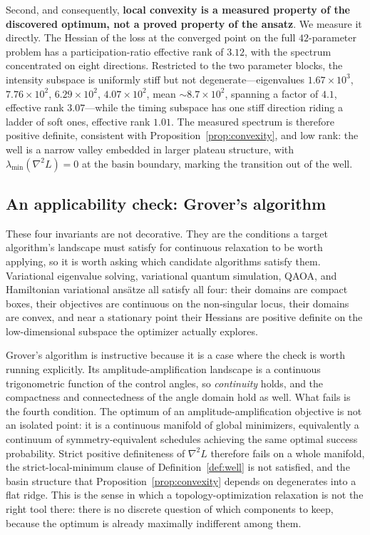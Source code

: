 \documentclass[twocolumn,aps,prl,superscriptaddress,showkeys]{revtex4-2}
\theoremstyle{plain}
\theoremstyle{definition}
\begin{document}
Second, and consequently, \textbf{local convexity is a measured property of the discovered optimum, not a proved property of the ansatz}. We measure it directly. The Hessian of the loss at the converged point on the full $42$-parameter problem has a participation-ratio effective rank of $3.12$, with the spectrum concentrated on eight directions. Restricted to the two parameter blocks, the intensity subspace is uniformly stiff but not degenerate---eigenvalues $1.67\times10^3$, $7.76\times10^2$, $6.29\times10^2$, $4.07\times10^2$, mean $\sim\!8.7\times10^2$, spanning a factor of $4.1$, effective rank $3.07$---while the timing subspace has one stiff direction riding a ladder of soft ones, effective rank $1.01$. The measured spectrum is therefore positive definite, consistent with Proposition~\ref{prop:convexity}, and low rank: the well is a narrow valley embedded in larger plateau structure, with $\lambda_{\min}(\nabla^2 L)=0$ at the basin boundary, marking the transition out of the well.

\subsection{An applicability check: Grover's algorithm}

These four invariants are not decorative. They are the conditions a target algorithm's landscape must satisfy for continuous relaxation to be worth applying, so it is worth asking which candidate algorithms satisfy them. Variational eigenvalue solving, variational quantum simulation, QAOA, and Hamiltonian variational ans\"atze all satisfy all four: their domains are compact boxes, their objectives are continuous on the non-singular locus, their domains are convex, and near a stationary point their Hessians are positive definite on the low-dimensional subspace the optimizer actually explores.

Grover's algorithm is instructive because it is a case where the check is worth running explicitly. Its amplitude-amplification landscape is a continuous trigonometric function of the control angles, so \emph{continuity} holds, and the compactness and connectedness of the angle domain hold as well. What fails is the fourth condition. The optimum of an amplitude-amplification objective is not an isolated point: it is a continuous manifold of global minimizers, equivalently a continuum of symmetry-equivalent schedules achieving the same optimal success probability. Strict positive definiteness of $\nabla^2 L$ therefore fails on a whole manifold, the strict-local-minimum clause of Definition~\ref{def:well} is not satisfied, and the basin structure that Proposition~\ref{prop:convexity} depends on degenerates into a flat ridge. This is the sense in which a topology-optimization relaxation is not the right tool there: there is no discrete question of which components to keep, because the optimum is already maximally indifferent among them.
\end{document}
